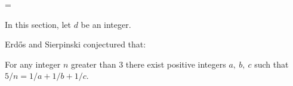 \documentclass[12pt]{article}
\begin{document}
\parskip =\baselineskip
	

\begin{cnl}
		
		
\bigskip
		


In this section, let $d$ be an integer.



\begin{remark}
Erd\H{o}s and Sierpinski conjectured that:  
\end{remark}

\begin{conjecture}
For any integer $ n$ greater than 3 there exist 
positive integers $a,\ b,\ c $ such that $ 5/n=1/a + 1/b + 1/c $. 
\end{conjecture}


\end{cnl}
\end{document}

